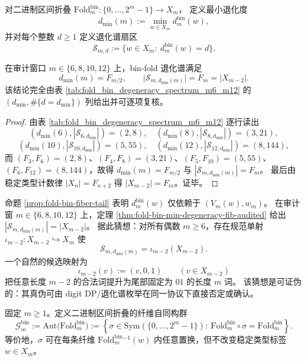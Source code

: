 \begin{definition}\label{def:fold-bin-degeneracy-sectors}
对二进制区间折叠 \(\mathrm{Fold}^{\mathrm{bin}}_m:\{0,\dots,2^m-1\}\to X_m\)，
定义最小退化度
\[
d_{\min}(m):=\min_{w\in X_m} d^{\mathrm{bin}}_m(w),
\]
并对每个整数 \(d\ge 1\) 定义退化谱扇区
\[
\mathcal{S}_{m,d}:=\{w\in X_m:\ d^{\mathrm{bin}}_m(w)=d\}.
\]
\end{definition}

\begin{theorem}\label{thm:fold-bin-min-degeneracy-fib-audited}
在审计窗口 \(m\in\{6,8,10,12\}\) 上，bin-fold 退化谱满足
\[
d_{\min}(m)=F_{m/2},
\qquad
\bigl|\mathcal{S}_{m,d_{\min}(m)}\bigr|=F_m=|X_{m-2}|.
\]
该结论完全由表 \ref{tab:fold_bin_degeneracy_spectrum_m6_m12} 的 \((d_{\min},\#\{d=d_{\min}\})\) 列给出并可逐项复核。
\end{theorem}
\begin{proof}
由表 \ref{tab:fold_bin_degeneracy_spectrum_m6_m12} 逐行读出
\[
(d_{\min}(6),|\mathcal{S}_{6,d_{\min}}|)=(2,8),\quad
(d_{\min}(8),|\mathcal{S}_{8,d_{\min}}|)=(3,21),
\]
\[
(d_{\min}(10),|\mathcal{S}_{10,d_{\min}}|)=(5,55),\quad
(d_{\min}(12),|\mathcal{S}_{12,d_{\min}}|)=(8,144),
\]
而 \((F_{3},F_{6})=(2,8)\)、\((F_{4},F_{8})=(3,21)\)、\((F_{5},F_{10})=(5,55)\)、\((F_{6},F_{12})=(8,144)\)，故得 \(d_{\min}(m)=F_{m/2}\) 与 \(|\mathcal{S}_{m,d_{\min}(m)}|=F_m\)。
最后由稳定类型计数律 \(|X_n|=F_{n+2}\) 得 \(|X_{m-2}|=F_m\)。证毕。
\end{proof}

\begin{conjecture}[最小退化扇区的正则子覆盖猜想]\label{conj:fold-bin-min-sector-regular-subcover}
命题 \ref{prop:fold-bin-fiber-tail} 表明 \(d^{\mathrm{bin}}_m(w)\) 仅依赖于 \((V_m(w),w_m)\)。
在审计窗 \(m\in\{6,8,10,12\}\) 上，定理 \ref{thm:fold-bin-min-degeneracy-fib-audited} 给出
\(
|\mathcal{S}_{m,d_{\min}(m)}|=|X_{m-2}|
\)。
据此猜想：对所有偶数 \(m\ge 6\)，存在规范单射 \(\iota_{m-2}:X_{m-2}\hookrightarrow X_m\) 使
\[
\mathcal{S}_{m,d_{\min}(m)}=\iota_{m-2}(X_{m-2}).
\]
一个自然的候选映射为
\[
\iota_{m-2}(v):=(v,0,1)\qquad (v\in X_{m-2})
\]
把任意长度 \(m-2\) 的合法词提升为尾部固定为 \(01\) 的长度 \(m\) 词。
该猜想是可证伪的：其真伪可由 digit DP/退化谱枚举在同一协议下直接否定或确认。
\end{conjecture}

\begin{definition}\label{def:fold-bin-gauge-group}
固定 \(m\ge 1\)。定义二进制区间折叠的纤维自同构群
\[
\mathcal{G}^{\mathrm{bin}}_m
:=
\mathrm{Aut}\!\bigl(\mathrm{Fold}^{\mathrm{bin}}_m\bigr)
:=
\left\{\sigma\in \mathrm{Sym}(\{0,\dots,2^m-1\}):\ \mathrm{Fold}^{\mathrm{bin}}_m\circ\sigma=\mathrm{Fold}^{\mathrm{bin}}_m\right\}.
\]
等价地，\(\sigma\) 可在每条纤维 \(\mathrm{Fold}^{\mathrm{bin}}_m{}^{-1}(w)\) 内任意置换，但不改变稳定类型标签 \(w\in X_m\)。
\end{definition}


